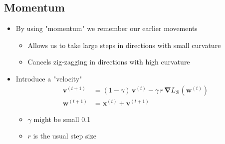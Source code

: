 \documentclass[11pt]{article}
\newcommand{\grad}{\bm{\nabla}}
\begin{document}
\subsection{Momentum}
\label{sec:orgb81d344}
\begin{itemize}
\item By using "momentum" we remember our earlier movements
\begin{itemize}
\item Allows us to take large steps in directions with small curvature
\item Cancels zig-zagging in directions with high curvature
\end{itemize}
\item Introduce a "velocity"
\begin{align*}
 \bm{v}^{(t+1)} &= (1-\gamma)\, \bm{v}^{(t)} - \gamma\,r\,\grad L_{\mathcal{B}}(\bm{w}^{(t)}) \\
 \bm{w}^{(t+1)} &= \bm{x}^{(t)}  + \bm{v}^{(t+1)}
\end{align*}
\begin{itemize}
\item \(\gamma\) might be small 0.1
\item \(r\) is the usual step size
\end{itemize}
\end{itemize}
\end{document}

